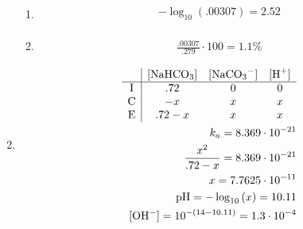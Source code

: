 \documentclass[12pt]{article}
\begin{document}
\begin{enumerate}
\begin{enumerate}
      \item

    \begin{equation}
      \begin{split}
        -\log_{10}\left( .00307 \right)=2.52\\
      \end{split}
      \label{7}
    \end{equation}

      \item

    \begin{equation}
      \begin{split}
        \frac{.00307}{.279}\cdot100=1.1\%
      \end{split}
      \label{8}
    \end{equation}

    \end{enumerate}

    \setcounter{enumi}{71}

  \item

    \begin{equation}
      \begin{split}
        \begin{array}{c | c c c} & [\ce{NaHCO3}] & [\ce{NaCO3-}] & [\ce{H+}]\\ \hline  \text{I} & .72 & 0 & 0\\ \text{C} & -x & x & x\\ \text{E} & .72-x & x & x  \end{array}\\
        k_a=8.369\cdot10^{-21}\\
        \frac{x^2}{.72-x}=8.369\cdot10^{-21}\\
        x=7.7625\cdot10^{-11}\\
        \text{p\ce{H}}=-\log_{10}\left( x \right)=10.11\\
        [\ce{OH-}]=10^{-(14-10.11)}=1.3\cdot10^{-4}
      \end{split}
      \label{9}
    \end{equation}

\end{enumerate}
\end{document}
